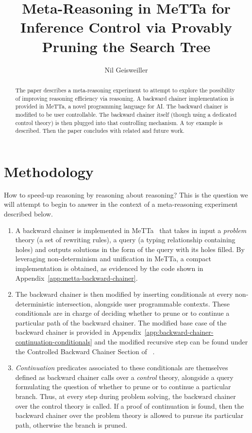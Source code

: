 \documentclass{easychair}
\title{Meta-Reasoning in MeTTa for Inference Control via Provably
  Pruning the Search Tree}
\author{Nil Geisweiller}
\institute{
  SingularityNET Foundation,\\
  Zug, Switzerland\\
  \email{nil@singularitynet.io}
}
\begin{document}
\maketitle

\begin{abstract}
The paper describes a meta-reasoning experiment to attempt to explore
the possibility of improving reasoning efficiency via reasoning. A
backward chainer implementation is provided in MeTTa, a novel
programming language for AI. The backward chainer is modified to be
user controllable. The backward chainer itself (though using a
dedicated control theory) is then plugged into that controlling
mechanism. A toy example is described. Then the paper concludes with
related and future work.
\end{abstract}

\section{Methodology}
\label{sect:introduction}

How to speed-up reasoning by reasoning about reasoning?  This is the
question we will attempt to begin to answer in the context of a
meta-reasoning experiment described below.
\begin{enumerate}
\item A backward chainer is implemented in MeTTa~\cite{MeTTa,
  MeTTaSpecification2021, Goertzel2021MeTTa, Meredith2023} that takes
  in input a \emph{problem} theory (a set of rewriting rules), a query
  (a typing relationship containing holes) and outputs solutions in
  the form of the query with its holes filled.  By leveraging
  non-determinism and unification in MeTTa, a compact implementation
  is obtained, as evidenced by the code shown in
  Appendix~\ref{app:metta-backward-chainer}.
\item The backward chainer is then modified by inserting conditionals
  at every non-deterministic intersection, alongside user programmable
  contexts.  These conditionals are in charge of deciding whether to
  prune or to continue a particular path of the backward chainer.  The
  modified base case of the backward chainer is provided in
  Appendix~\ref{app:backward-chainer-continuation-conditionals} and
  the modified recursive step can be found under the Controlled
  Backward Chainer Section of ~\cite{Geisweiller2024ICM}.
\item \emph{Continuation} predicates associated to these conditionals
  are themselves defined as backward chainer calls over a
  \emph{control} theory, alongside a query formulating the question of
  whether to prune or to continue a particular branch.  Thus, at every
  step during problem solving, the backward chainer over the control
  theory is called.  If a proof of continuation is found, then the
  backward chainer over the problem theory is allowed to pursue its
  particular path, otherwise the branch is pruned.
\end{enumerate}
\end{document}
